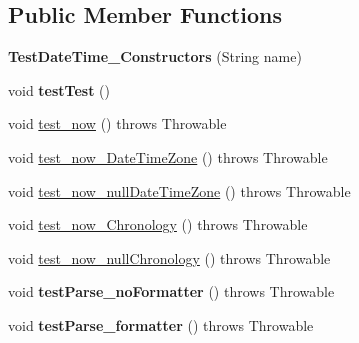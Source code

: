 \subsection*{Public Member Functions}
\begin{DoxyCompactItemize}
\item 
\hypertarget{classorg_1_1joda_1_1time_1_1_test_date_time___constructors_a2693d7f605ed7a5c0463b31da4c4c3ae}{{\bfseries Test\-Date\-Time\-\_\-\-Constructors} (String name)}\label{classorg_1_1joda_1_1time_1_1_test_date_time___constructors_a2693d7f605ed7a5c0463b31da4c4c3ae}

\item 
\hypertarget{classorg_1_1joda_1_1time_1_1_test_date_time___constructors_ad01124e9674f63c353affce07abac10c}{void {\bfseries test\-Test} ()}\label{classorg_1_1joda_1_1time_1_1_test_date_time___constructors_ad01124e9674f63c353affce07abac10c}

\item 
void \hyperlink{classorg_1_1joda_1_1time_1_1_test_date_time___constructors_ad53379cf8c0e5ff4e52540bdee349e61}{test\-\_\-now} ()  throws Throwable 
\item 
void \hyperlink{classorg_1_1joda_1_1time_1_1_test_date_time___constructors_aef26d8505ff1ba56664f96e6552c59dc}{test\-\_\-now\-\_\-\-Date\-Time\-Zone} ()  throws Throwable 
\item 
void \hyperlink{classorg_1_1joda_1_1time_1_1_test_date_time___constructors_a7988c34a0e9088dd92ca0253890bdcd9}{test\-\_\-now\-\_\-null\-Date\-Time\-Zone} ()  throws Throwable 
\item 
void \hyperlink{classorg_1_1joda_1_1time_1_1_test_date_time___constructors_ab0be13d6ce446f665a1c8bde394bf2a9}{test\-\_\-now\-\_\-\-Chronology} ()  throws Throwable 
\item 
void \hyperlink{classorg_1_1joda_1_1time_1_1_test_date_time___constructors_a402fce96f2a22f466e29ff16879c4a7d}{test\-\_\-now\-\_\-null\-Chronology} ()  throws Throwable 
\item 
\hypertarget{classorg_1_1joda_1_1time_1_1_test_date_time___constructors_ae5a93b3d30be72a8f6be8d52a61c20e9}{void {\bfseries test\-Parse\-\_\-no\-Formatter} ()  throws Throwable }\label{classorg_1_1joda_1_1time_1_1_test_date_time___constructors_ae5a93b3d30be72a8f6be8d52a61c20e9}

\item 
\hypertarget{classorg_1_1joda_1_1time_1_1_test_date_time___constructors_ab167138a18e5645df2b5cdf947708e7b}{void {\bfseries test\-Parse\-\_\-formatter} ()  throws Throwable }\label{classorg_1_1joda_1_1time_1_1_test_date_time___constructors_ab167138a18e5645df2b5cdf947708e7b}


\end{DoxyCompactItemize}
